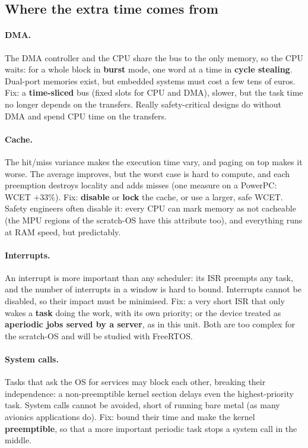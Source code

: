 \subsection{Where the extra time comes from}
\paragraph{DMA.} The DMA controller and the CPU share the bus to the only memory, so the CPU waits: for a whole block in \textbf{burst} mode, one word at a time in \textbf{cycle stealing}. Dual-port memories exist, but embedded systems must cost a few tens of euros. Fix: a \textbf{time-sliced} bus (fixed slots for CPU and DMA), slower, but the task time no longer depends on the transfers. Really safety-critical designs do without DMA and spend CPU time on the transfers.

\paragraph{Cache.} The hit/miss variance makes the execution time vary, and paging on top makes it worse. The average improves, but the worst case is hard to compute, and each preemption destroys locality and adds misses (one measure on a PowerPC: WCET $+33\%$). Fix: \textbf{disable} or \textbf{lock} the cache, or use a larger, safe WCET. Safety engineers often disable it: every CPU can mark memory as not cacheable (the MPU regions of the scratch-OS have this attribute too), and everything runs at RAM speed, but predictably.

\paragraph{Interrupts.} An interrupt is more important than any scheduler: its ISR preempts any task, and the number of interrupts in a window is hard to bound. Interrupts cannot be disabled, so their impact must be minimised. Fix: a very short ISR that only wakes a \textbf{task} doing the work, with its own priority; or the device treated as \textbf{aperiodic jobs served by a server}, as in this unit. Both are too complex for the scratch-OS and will be studied with FreeRTOS.

\paragraph{System calls.} Tasks that ask the OS for services may block each other, breaking their independence: a non-preemptible kernel section delays even the highest-priority task. System calls cannot be avoided, short of running bare metal (as many avionics applications do). Fix: bound their time and make the kernel \textbf{preemptible}, so that a more important periodic task stops a system call in the middle.


